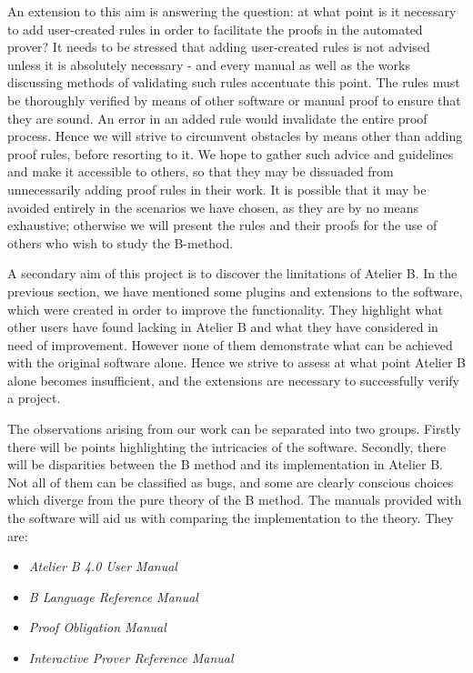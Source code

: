 \documentclass[12pt,journal,duplex]{IEEEtran}
\begin{document}
	An extension to this aim is answering the question: at what point is it necessary to add user-created rules in order to facilitate the proofs in the automated prover? It needs to be stressed that adding user-created rules is not advised unless it is absolutely necessary - and every manual as well as the works discussing methods of validating such rules accentuate this point. The rules must be thoroughly verified by means of other software or manual proof to ensure that they are sound. An error in an added rule would invalidate the entire proof process. Hence we will strive to circumvent obstacles by means other than adding proof rules, before resorting to it. We hope to gather such advice and guidelines and make it accessible to others, so that they may be dissuaded from unnecessarily adding proof rules in their work. It is possible that it may be avoided entirely in the scenarios we have chosen, as they are by no means exhaustive; otherwise we will present the rules and their proofs for the use of others who wish to study the B-method.
	
	A secondary aim of this project is to discover the limitations of Atelier B. In the previous section, we have mentioned some plugins and extensions to the software, which were created in order to improve the functionality. They highlight what other users have found lacking in Atelier B and what they have considered in need of improvement. However none of them demonstrate what can be achieved with the original software alone. Hence we strive to assess at what point Atelier B alone becomes insufficient, and the extensions are necessary to successfully verify a project.

	The observations arising from our work can be separated into two groups. Firstly there will be points highlighting the intricacies of the software. Secondly, there will be disparities between the B method and its implementation in Atelier B. Not all of them can be classified as bugs, and some are clearly conscious choices which diverge from the pure theory of the B method. The manuals provided with the software will aid us with comparing the implementation to the theory. They are:

	\begin{itemize}
		\item \emph{Atelier B 4.0 User Manual}
		\item \emph{B Language Reference Manual}
		\item \emph{Proof Obligation Manual}
		\item \emph{Interactive Prover Reference Manual}
	\end{itemize}
\end{document}

